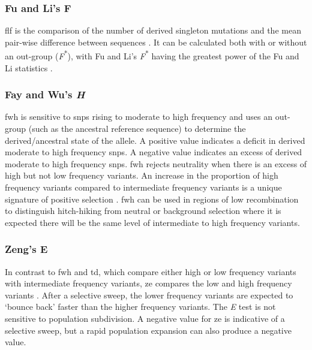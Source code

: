 \documentclass[twoside,openright]{report}
\begin{document}
\subsubsection{Fu and Li's F}\label{fu-and-lis-f}

\gls{flf} is the comparison of the number of derived singleton mutations
and the mean pair-wise difference between sequences \citep{Fu1993}. It
can be calculated both with or without an out-group
(\emph{F}\textsuperscript{*}), with Fu and Li's
\emph{F}\textsuperscript{*} having the greatest power of the Fu and Li
statistics \citep{Fu1993, Ramirez-Soriano2008}.

\subsubsection{\texorpdfstring{Fay and Wu's
\emph{H}}{Fay and Wu's H}}\label{fay-and-wus-h}

\gls{fwh} is sensitive to \glspl{snp} rising to moderate to high
frequency and uses an out-group (such as the ancestral reference
sequence) to determine the derived/ancestral state of the allele. A
positive value indicates a deficit in derived moderate to high frequency
\glspl{snp}. A negative value indicates an excess of derived moderate to
high frequency \glspl{snp}. \Gls{fwh} rejects neutrality when there is
an excess of high but not low frequency variants. An increase in the
proportion of high frequency variants compared to intermediate frequency
variants is a unique signature of positive selection
\citep{fay2000hitchhiking}. \Gls{fwh} can be used in regions of low
recombination to distinguish hitch-hiking from neutral or background
selection where it is expected there will be the same level of
intermediate to high frequency variants.

\subsubsection{Zeng's E}\label{zengs-e}

In contrast to \gls{fwh} and \gls{td}, which compare either high or low
frequency variants with intermediate frequency variants, \gls{ze}
compares the low and high frequency variants \citep{Zeng2006}. After a
selective sweep, the lower frequency variants are expected to `bounce
back' faster than the higher frequency variants. The \emph{E} test is
not sensitive to population subdivision. A negative value for \gls{ze}
is indicative of a selective sweep, but a rapid population expansion can
also produce a negative value.
\end{document}
